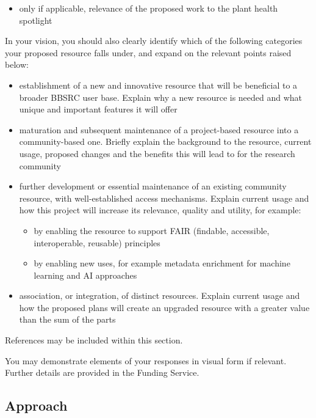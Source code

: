 \documentclass[12in]{article}
\begin{document}
{\begin{itemize}
\item only if applicable, relevance of the proposed work to the plant health spotlight

\end{itemize}

In your vision, you should also clearly identify which of the following categories
your proposed resource falls under, and expand on the relevant points raised
below:

\begin{itemize}

\item establishment of a new and innovative resource that will be beneficial to a
broader BBSRC user base. Explain why a new resource is needed and what
unique and important features it will offer
\item maturation and subsequent maintenance of a project-based resource into a
community-based one. Briefly explain the background to the resource,
current usage, proposed changes and the benefits this will lead to for the
research community
\item further development or essential maintenance of an existing community
resource, with well-established access mechanisms. Explain current usage
and how this project will increase its relevance, quality and utility, for
example:

\begin{itemize}

\item by enabling the resource to support FAIR (findable, accessible,
interoperable, reusable) principles
\item by enabling new uses, for example metadata enrichment for machine
learning and AI approaches

\end{itemize}

\item association, or integration, of distinct resources. Explain current usage and
how the proposed plans will create an upgraded resource with a greater
value than the sum of the parts

\end{itemize}

References may be included within this section.

You may demonstrate elements of your responses in visual form if relevant.
Further details are provided in the Funding Service.
}

\pagebreak

\subsection{Approach}
\end{document}
